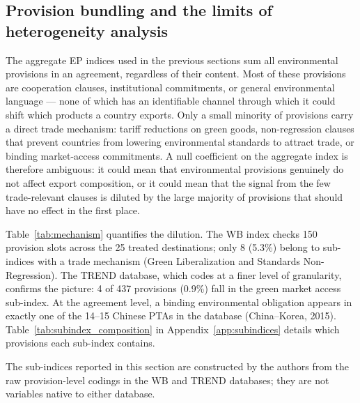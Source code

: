 \documentclass[12pt]{article}
\begin{document}
\subsection{Provision bundling and the limits of heterogeneity analysis}\label{sec:bundling}

The aggregate EP indices used in the previous sections sum all environmental provisions in an agreement, regardless of their content. Most of these provisions are cooperation clauses, institutional commitments, or general environmental language --- none of which has an identifiable channel through which it could shift which products a country exports. Only a small minority of provisions carry a direct trade mechanism: tariff reductions on green goods, non-regression clauses that prevent countries from lowering environmental standards to attract trade, or binding market-access commitments. A null coefficient on the aggregate index is therefore ambiguous: it could mean that environmental provisions genuinely do not affect export composition, or it could mean that the signal from the few trade-relevant clauses is diluted by the large majority of provisions that should have no effect in the first place.

Table~\ref{tab:mechanism} quantifies the dilution. The WB index checks 150 provision slots across the 25 treated destinations; only 8 (5.3\%) belong to sub-indices with a trade mechanism (Green Liberalization and Standards Non-Regression). The TREND database, which codes at a finer level of granularity, confirms the picture: 4 of 437 provisions (0.9\%) fall in the green market access sub-index. At the agreement level, a binding environmental obligation appears in exactly one of the 14--15 Chinese PTAs in the database (China--Korea, 2015). Table~\ref{tab:subindex_composition} in Appendix~\ref{app:subindices} details which provisions each sub-index contains.

The sub-indices reported in this section are constructed by the authors from the raw provision-level codings in the WB and TREND databases; they are not variables native to either database.
\end{document}
